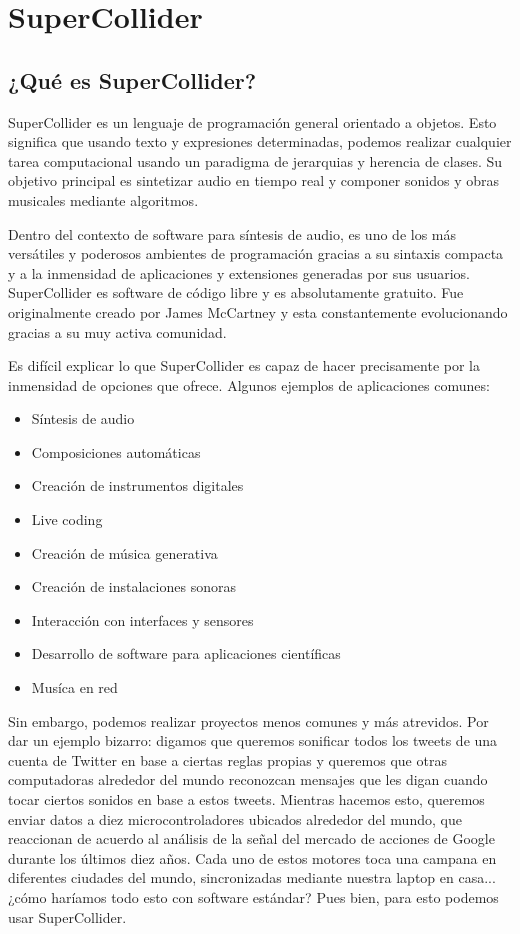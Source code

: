 \chapter{SuperCollider}

\section{¿Qué es SuperCollider?}

SuperCollider es un lenguaje de programación general orientado a objetos. Esto significa que usando texto y expresiones determinadas, podemos realizar cualquier tarea computacional usando un paradigma de jerarquias y herencia de clases. Su objetivo principal es sintetizar audio en tiempo real y componer sonidos y obras musicales mediante algoritmos. 

Dentro del contexto de software para síntesis de audio, es uno de los más versátiles y poderosos ambientes de programación gracias a su sintaxis compacta y a la inmensidad de aplicaciones y extensiones generadas por sus usuarios. SuperCollider es software de código libre y es absolutamente gratuito. Fue originalmente creado por James McCartney y esta constantemente evolucionando gracias a su muy activa comunidad. 

Es difícil explicar lo que SuperCollider es capaz de hacer precisamente por la inmensidad de opciones que ofrece. Algunos ejemplos de aplicaciones comunes:

\begin{itemize}
\item Síntesis de audio
\item Composiciones automáticas
\item Creación de instrumentos digitales
\item Live coding
\item Creación de música generativa
\item Creación de instalaciones sonoras
\item Interacción con interfaces y sensores
\item Desarrollo de software para aplicaciones científicas
\item Musíca en red
\end{itemize}

Sin embargo, podemos realizar proyectos menos comunes y más atrevidos. Por dar un ejemplo bizarro: digamos que queremos sonificar todos los tweets de una cuenta de Twitter en base a ciertas reglas propias y queremos que otras computadoras alrededor del mundo reconozcan mensajes que les digan cuando tocar ciertos sonidos en base a estos tweets. Mientras hacemos esto, queremos enviar datos a diez microcontroladores ubicados alrededor del mundo, que reaccionan de acuerdo al análisis de la señal del mercado de acciones de Google durante los últimos diez años. Cada uno de estos motores toca una campana en diferentes ciudades del mundo, sincronizadas mediante nuestra laptop en casa... ¿cómo haríamos todo esto con software estándar? Pues bien, para esto podemos usar SuperCollider.

